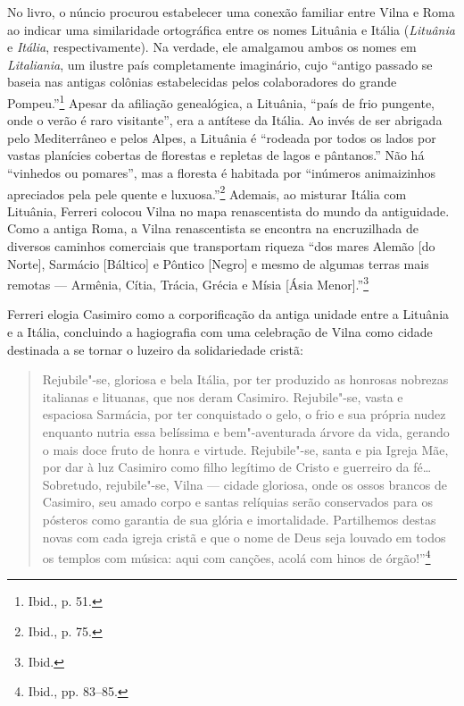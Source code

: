 No livro, o núncio procurou estabelecer uma conexão familiar entre Vilna
e Roma ao indicar uma similaridade ortográfica entre os nomes Lituânia e
Itália (\textit{Lituânia} e \textit{Itália}, respectivamente). Na verdade,
ele amalgamou ambos os nomes em \textit{Litaliania}, um ilustre país
completamente imaginário, cujo ``antigo passado se baseia nas antigas
colônias estabelecidas pelos colaboradores do grande Pompeu.''\footnote{Ibid.,
  p. 51.} Apesar da afiliação genealógica, a Lituânia, ``país de frio
pungente, onde o verão é raro visitante'', era a antítese da Itália. Ao
invés de ser abrigada pelo Mediterrâneo e pelos Alpes, a Lituânia é
``rodeada por todos os lados por vastas planícies cobertas de florestas
e repletas de lagos e pântanos.'' Não há ``vinhedos ou pomares'', mas a
floresta é habitada por ``inúmeros animaizinhos apreciados pela pele
quente e luxuosa.''\footnote{Ibid., p. 75.} Ademais, ao misturar Itália
com Lituânia, Ferreri colocou Vilna no mapa renascentista do mundo da
antiguidade. Como a antiga Roma, a Vilna renascentista se encontra na
encruzilhada de diversos caminhos comerciais que transportam riqueza
``dos mares Alemão {[}do Norte{]}, Sarmácio {[}Báltico{]} e Pôntico
{[}Negro{]} e mesmo de algumas terras mais remotas --- Armênia, Cítia,
Trácia, Grécia e Mísia {[}Ásia Menor{]}.''\footnote{Ibid.}

Ferreri elogia Casimiro como a corporificação da antiga unidade entre a
Lituânia e a Itália, concluindo a hagiografia com uma celebração de
Vilna como cidade destinada a se tornar o luzeiro da solidariedade
cristã:

\begin{quote}
Rejubile"-se, gloriosa e bela Itália, por ter produzido as honrosas
nobrezas italianas e lituanas, que nos deram Casimiro. Rejubile"-se,
vasta e espaciosa Sarmácia, por ter conquistado o gelo, o frio e sua
própria nudez enquanto nutria essa belíssima e bem"-aventurada árvore da
vida, gerando o mais doce fruto de honra e virtude. Rejubile"-se, santa e
pia Igreja Mãe, por dar à luz Casimiro como filho legítimo de Cristo e
guerreiro da fé\ldots{} Sobretudo, rejubile"-se, Vilna --- cidade gloriosa,
onde os ossos brancos de Casimiro, seu amado corpo e santas relíquias
serão conservados para os pósteros como garantia de sua glória e
imortalidade. Partilhemos destas novas com cada igreja cristã e que o
nome de Deus seja louvado em todos os templos com música: aqui com
canções, acolá com hinos de órgão!''\footnote{Ibid., pp. 83--85.}
\end{quote}

